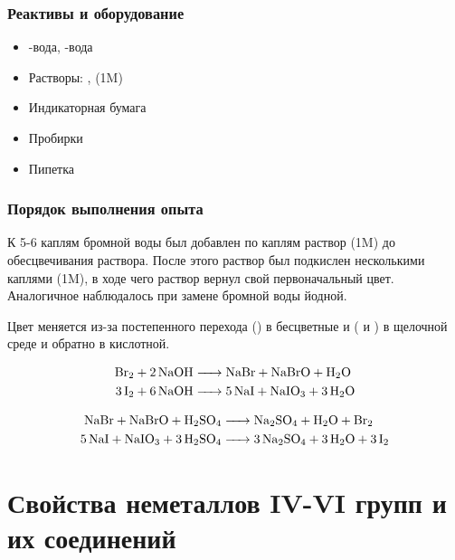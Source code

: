 \documentclass[a4paper, 12pt]{article}
\begin{document}
\subsubsection{Реактивы и оборудование}

\begin{itemize}
	\item {}-вода, -вода
	
	\item Растворы: ,  (1M)
	
	\item Индикаторная бумага
	
	\item Пробирки
	
	\item Пипетка
\end{itemize}

\subsubsection{Порядок выполнения опыта}

К 5-6 каплям бромной воды был добавлен по каплям раствор  (1M) до обесцвечивания раствора. После этого раствор был подкислен несколькими каплями  (1M), в ходе чего раствор вернул свой первоначальный цвет. Аналогичное наблюдалось при замене бромной воды йодной.

Цвет меняется из-за постепенного перехода  () в бесцветные  и  ( и ) в щелочной среде и обратно в кислотной.

\begin{align}
	\ce{Br2 + 2NaOH &-> NaBr + NaBrO + H2O}\\
	\ce{3I2 + 6NaOH &-> 5NaI + NaIO3 + 3H2O}
\end{align}

\begin{align}
	\ce{NaBr + NaBrO + H2SO4 &-> Na2SO4 + H2O + Br2}\\
	\ce{5NaI + NaIO3 + 3H2SO4 &-> 3Na2SO4 + 3H2O + 3I2}
\end{align}

\newpage


\section{Свойства неметаллов IV-VI групп и их соединений}
\end{document}
